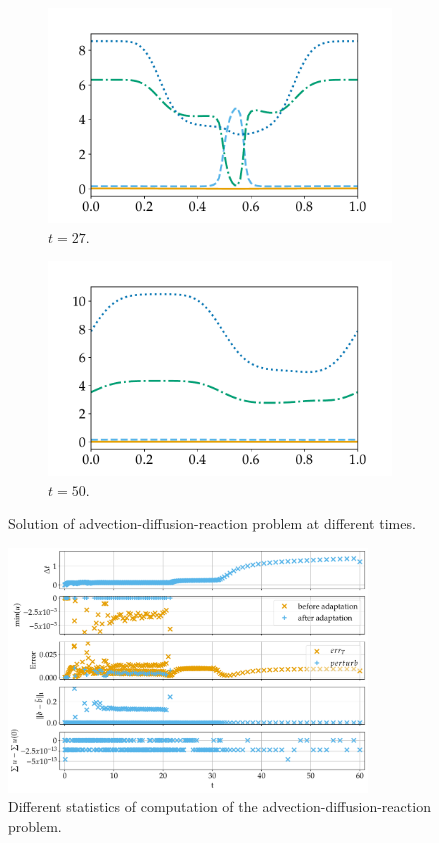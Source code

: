 \documentclass[a4paper]{article}
\numberwithin{equation}{section}
\theoremstyle{plain}
\theoremstyle{definition}
\numberwithin{theorem}{section}
\newcommand{\1}{\mathbbm{1}}
\begin{document}
\begin{figure}
    \begin{subfigure}[b]{0.49\textwidth}
        \includegraphics[width=\textwidth]{plots/ADP_sol_27.pdf}
        \caption{$t=27$.}
        \label{fig:sol_ADP27}
    \end{subfigure}
	\begin{subfigure}[b]{0.49\textwidth}
        \includegraphics[width=\textwidth]{plots/ADP_sol_50.pdf}
        \caption{$t=50$.}
        \label{fig:sol_ADP50}
    \end{subfigure}
    \caption{Solution of advection-diffusion-reaction problem at different times.}\label{fig:Sol_ADP}
\end{figure}

\begin{figure}
\centering
\includegraphics[width=0.85\textwidth]{plots/ADP_stepsize,b.pdf}
\caption{Different statistics of computation of the advection-diffusion-reaction problem.}
\label{fig:Stats_ADP}
\end{figure}
\end{document}
